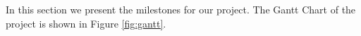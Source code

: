 In this section we present the milestones for our project. The Gantt Chart of the project is shown in Figure \ref{fig:gantt}.



